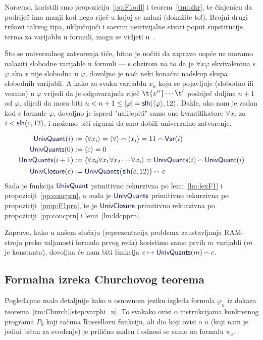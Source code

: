 Naravno, koristili smo propoziciju~\ref{pp:F1odl} i teorem~\ref{tm:oikr}, te činjenicu da podriječ ima manji kod nego riječ u kojoj se nalazi (dokažite to!). Brojni drugi trikovi takvog tipa, uključujući i sasvim netrivijalne stvari poput supstitucije terma za varijablu u formuli, mogu se vidjeti u~\cite{smullyan}.

Što se univerzalnog zatvorenja tiče, bitno je uočiti da zapravo uopće ne moramo nalaziti slobodne varijable u formuli --- s obzirom na to da je $\forall x\varphi$ ekvivalentna s $\varphi$ ako $x$ nije slobodna u $\varphi$, dovoljno je naći neki konačni nadskup skupa slobodnih varijabli. A kako za svaku varijablu $x_n$ koja se pojavljuje (slobodno ili vezano) u $\varphi$ vrijedi da je odgovarajuća riječ $\t{x{}'{}'}\dotsm\t'$ podriječ duljine $n+1$ od $\varphi$, slijedi da mora biti $n<n+1\le\dulj\varphi=\f{slh}(\kr{\varphi},12)$. Dakle, ako nam je zadan kod $c$ formule $\varphi$, dovoljno je ispred "nalijepiti" samo one kvantifikatore $\forall x_i$ za $i<\f{slh}(c,12)$, i možemo biti sigurni da smo dobili univerzalno zatvorenje.

\noindent\begin{align}
    \f{UnivQuant}(i)&:=\kr{\forall x_i}=\kr{\forall}\conc{}\kr{x_i}=11\conc{}\f{Var}(i)\\
    \f{UnivQuants}(0)&:=\kr{\varepsilon}=0\\
    \f{UnivQuants}(i+1)&:=\kr{\forall x_0\forall x_1\forall x_2\dotsm\forall x_i}=\f{UnivQuants}(i)\conc{}\f{UnivQuant}(i)\\
    \f{UnivClosure}(c)&:=\f{UnivQuants}\bigl(\f{slh}(c,12)\bigr)\conc{}\,c
\end{align}
Sada je funkcija $\f{UnivQuant}$ primitivno rekurzivna po lemi~\ref{lm:lexF1} i propoziciji~\ref{pp:concprn}, a onda je $\f{UnivQuants}$ primitivno rekurzivna po propoziciji~\ref{prop:F1prn}, te je $\f{UnivClosure}$ primitivno rekurzivna po propoziciji~\ref{pp:concprn} i lemi~\ref{lm:ldcpprn}.

Zapravo, kako u našem slučaju (reprezentacija problema zaustavljanja RAM-stroja preko valjanosti formula prvog reda) koristimo samo prvih $m$ varijabli ($m$ je konstanta), dovoljna će nam biti funkcija $c\mapsto\f{UnivQuants}(m)\conc{}c$.

\subsection{Formalna izreka Churchovog teorema}

Pogledajmo malo detaljnije kako u osnovnom jeziku izgleda formula $\varphi_u$ iz dokaza teorema~\ref{tm:Church}\eqref{step:varphi_u}. To svakako ovisi o instrukcijama konkretnog programa $P_0$ koji računa Russellovu funkciju, ali dio koji ovisi o $u$ (koji nam je jedini bitan za svođenje) je prilično malen i odnosi se samo na formulu $\pi_u$.

